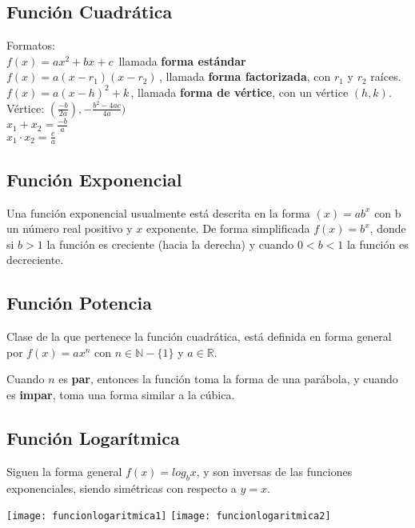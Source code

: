 \subsection{Función Cuadrática}
Formatos:\\
$f(x) = a x^2 + b x + c \,\!$ llamada \textbf{forma estándar}\\
$f(x) = a(x - r_1)(x - r_2)\,\!$, llamada \textbf{forma factorizada}, con $r_1$ y $r_2$ raíces.\\
$f(x) = a(x - h)^2 + k \,\!$, llamada \textbf{forma de vértice}, con un vértice $(h, k)$.\\

Vértice: $(\frac{-b}{2a}),-\frac{b^2-4ac}{4a})$\\
$x_1 + x_2 = \frac{-b}{a}$\\
$x_1 \cdot x_2 = \frac{c}{a}$\\

\subsection{Función Exponencial}
Una función exponencial usualmente está descrita en la forma $(x) = ab^x$ con b un número real positivo y $x$ exponente. De forma simplificada $f(x) = b^x$, donde si $b > 1$ la función es creciente (hacia la derecha) y cuando $0 < b < 1$ la función es decreciente.\\

\subsection{Función Potencia}
Clase de la que pertenece la función cuadrática, está definida en forma general por $f(x) = ax^n$ con $n \in \mathbb{N} - \{1\}$ y $a \in \mathbb{R}$.

Cuando $n$ es \textbf{par}, entonces la función toma la forma de una parábola, y cuando es \textbf{impar}, toma una forma similar a la cúbica.

\subsection{Función Logarítmica}
Siguen la forma general $f(x) = log_b{x}$, y son inversas de las funciones exponenciales, siendo simétricas con respecto a $y = x$.\\
\begin{minipage}[c]{\columnwidth}
    \texttt{[image: funcionlogaritmica1]}
    \texttt{[image: funcionlogaritmica2]}
\end{minipage}